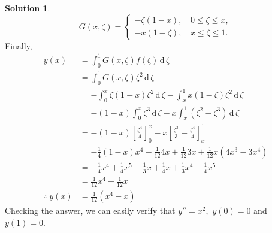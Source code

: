 \documentclass[12pt,a4paper]{article}
\theoremstyle{remark}
\theoremstyle{definition}
\newtheorem*{soln}{Solution}
\newcommand{\D}{\,\mathrm{d}\,}
\begin{document}
\begin{soln}
    \[
        G(x,\zeta)=\begin{cases}
            -\zeta(1-x), & \,0\leq \zeta\leq x, \\
            -x(1-\zeta), & \,x\leq \zeta\leq 1.
        \end{cases}
    \]
    Finally,
    \begin{align*}
        y(x)             & =\int_0^1G(x,\zeta)f(\zeta)\D\zeta                                                                  \\
                         & =\int_0^1G(x,\zeta)\zeta^2\D\zeta                                                                   \\
                         & =-\int_0^x \zeta(1-x)\zeta^2\D\zeta-\int_x^1 x(1-\zeta)\zeta^2\D\zeta                               \\
                         & =-(1-x)\int_0^x \zeta^3 \D\zeta-x\int_x^1 (\zeta^2-\zeta^3)\D\zeta                                  \\
                         & =-(1-x)\left[ \frac{\zeta^4}{4} \right]_0^x-x\left[ \frac{\zeta^3}{3}-\frac{\zeta^4}{4} \right]_x^1 \\
                         & =-\frac{1}{4}(1-x)x^4-\frac{1}{12}4x+\frac{1}{12}3x+\frac{1}{12}x\left( 4x^3-3x^4 \right)           \\
                         & =-\frac{1}{4}x^4+\frac{1}{4}x^5-\frac{1}{3}x+\frac{1}{4}x+\frac{1}{3}x^4-\frac{1}{4}x^5             \\
                         & =\frac{1}{12}x^4-\frac{1}{12}x                                                                      \\
        \therefore\,y(x) & =\frac{1}{12}\left( x^4-x \right)
    \end{align*}
    Checking the answer, we can easily verify that $ y''=x^2, $ $ y(0)=0 $ and $ y(1)=0 $.
\end{soln}
\end{document}
